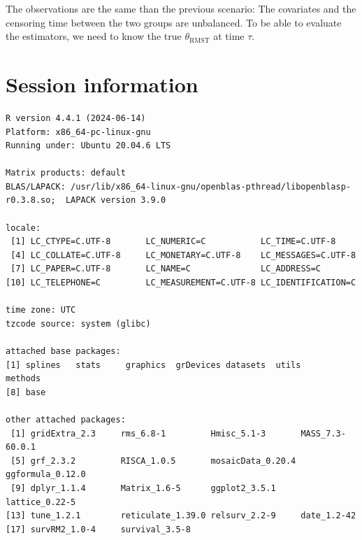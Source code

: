 \documentclass[
  11pt,
  a4paper,
]{article}
\theoremstyle{plain}
\theoremstyle{plain}
\theoremstyle{plain}
\theoremstyle{definition}
\theoremstyle{remark}
\begin{document}
The observations are the same than the previous scenario: The covariates
and the censoring time between the two groups are unbalanced. To be able
to evaluate the estimators, we need to know the true
\(\theta_{\mathrm{RMST}}\) at time \(\tau\).

\section*{Session information}\label{session-information}

\begin{verbatim}
R version 4.4.1 (2024-06-14)
Platform: x86_64-pc-linux-gnu
Running under: Ubuntu 20.04.6 LTS

Matrix products: default
BLAS/LAPACK: /usr/lib/x86_64-linux-gnu/openblas-pthread/libopenblasp-r0.3.8.so;  LAPACK version 3.9.0

locale:
 [1] LC_CTYPE=C.UTF-8       LC_NUMERIC=C           LC_TIME=C.UTF-8       
 [4] LC_COLLATE=C.UTF-8     LC_MONETARY=C.UTF-8    LC_MESSAGES=C.UTF-8   
 [7] LC_PAPER=C.UTF-8       LC_NAME=C              LC_ADDRESS=C          
[10] LC_TELEPHONE=C         LC_MEASUREMENT=C.UTF-8 LC_IDENTIFICATION=C   

time zone: UTC
tzcode source: system (glibc)

attached base packages:
[1] splines   stats     graphics  grDevices datasets  utils     methods  
[8] base     

other attached packages:
 [1] gridExtra_2.3     rms_6.8-1         Hmisc_5.1-3       MASS_7.3-60.0.1  
 [5] grf_2.3.2         RISCA_1.0.5       mosaicData_0.20.4 ggformula_0.12.0 
 [9] dplyr_1.1.4       Matrix_1.6-5      ggplot2_3.5.1     lattice_0.22-5   
[13] tune_1.2.1        reticulate_1.39.0 relsurv_2.2-9     date_1.2-42      
[17] survRM2_1.0-4     survival_3.5-8   


\end{verbatim}
\end{document}
